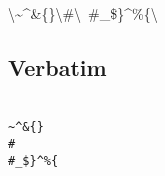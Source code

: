 \documentclass[pdftex,english,a4paper,10pt]{article}
\makeatletter
\def\docbooktolatexgobble{\expandafter\@gobble}
\makeatother
\begin{document}
    \textbackslash \textasciitilde{}\^{}\&\{\}\textbackslash \#\textbackslash \ \#\_\$\}\^{}\%\{\textbackslash 
    
\subsection{Verbatim}
\label{id176433}\hypertarget{id176433}{}%


    {\texttt{{\docbooktolatexgobble\string\\\textasciitilde{}\^{}\&\docbooktolatexgobble\string\{\docbooktolatexgobble\string\}\docbooktolatexgobble\string\\\#\docbooktolatexgobble\string\\ \#\_\$\docbooktolatexgobble\string\}\^{}\%\docbooktolatexgobble\string\{\docbooktolatexgobble\string\\}}}
    

\end{document}
